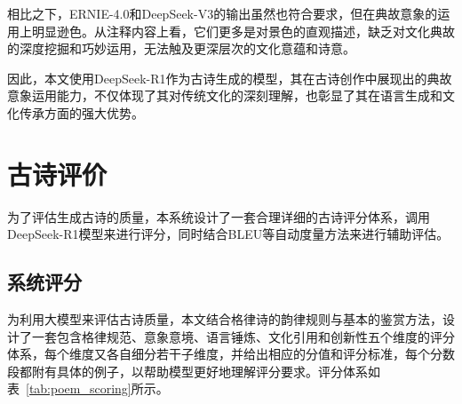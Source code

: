 相比之下，ERNIE-4.0和DeepSeek-V3的输出虽然也符合要求，但在典故意象的运用上明显逊色。从注释内容上看，它们更多是对景色的直观描述，缺乏对文化典故的深度挖掘和巧妙运用，无法触及更深层次的文化意蕴和诗意。

因此，本文使用DeepSeek-R1作为古诗生成的模型，其在古诗创作中展现出的典故意象运用能力，不仅体现了其对传统文化的深刻理解，也彰显了其在语言生成和文化传承方面的强大优势。

\section{古诗评价} \label{sec:poem_analysis}

为了评估生成古诗的质量，本系统设计了一套合理详细的古诗评分体系，调用DeepSeek-R1模型来进行评分，同时结合BLEU等自动度量方法来进行辅助评估。

\subsection{系统评分}

为利用大模型来评估古诗质量，本文结合格律诗的韵律规则与基本的鉴赏方法，设计了一套包含格律规范、意象意境、语言锤炼、文化引用和创新性五个维度的评分体系，每个维度又各自细分若干子维度，并给出相应的分值和评分标准，每个分数段都附有具体的例子，以帮助模型更好地理解评分要求。评分体系如表~\ref{tab:poem_scoring}所示。

